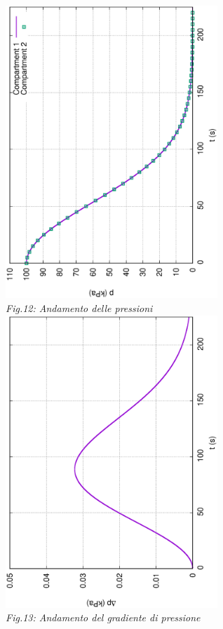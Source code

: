 \documentclass{article}
\begin{document}
        \begin{center}
            \includegraphics[width=0.6\textwidth, angle=-90]{MUL2/p_ES2_5.eps}\\ 
            \label{fig:press_10_5}
            \textit{Fig.12: Andamento delle pressioni} \\ 
            \includegraphics[width=0.6\textwidth, angle=-90]{MUL2/Dp_ES2_5.eps}\\
            \label{fig:grad_press_10_5}
            \textit{Fig.13: Andamento del gradiente di pressione}\\
        \end{center}
\end{document}

